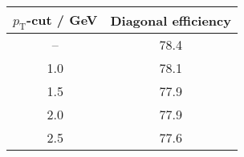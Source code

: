 \begin{tabular}{SS}
  \toprule
  {$p_\text{T}$-cut / \si{\giga\electronvolt}} & {Diagonal efficiency} \\
  \midrule
  {--} & 78.4 \\
  1.0 & 78.1 \\
  1.5 & 77.9 \\
  2.0 & 77.9 \\
  2.5 & 77.6 \\
  \bottomrule
\end{tabular}

